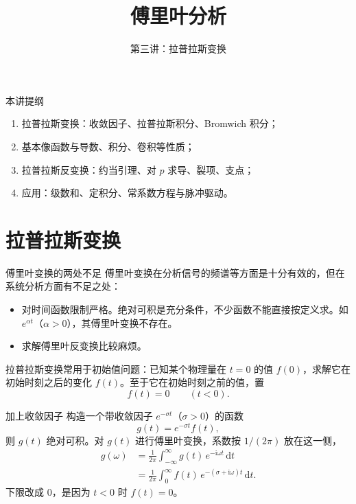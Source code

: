\documentclass[fontset=windows, chinese, 10pt, xcolor=dvipsnames]{beamer}
\title{傅里叶分析}
\subtitle{第三讲：拉普拉斯变换}
\begin{document}
\begin{frame}
  \titlepage
\end{frame}

\begin{frame}{本讲提纲}
  \begin{enumerate}
    \item 拉普拉斯变换：收敛因子、拉普拉斯积分、Bromwich 积分；
    \item 基本像函数与导数、积分、卷积等性质；
    \item 拉普拉斯反变换：约当引理、对 $p$ 求导、裂项、支点；
    \item 应用：级数和、定积分、常系数方程与脉冲驱动。
  \end{enumerate}
\end{frame}

\section{拉普拉斯变换}

\begin{frame}{傅里叶变换的两处不足}
  傅里叶变换在分析信号的频谱等方面是十分有效的，但在系统分析方面有不足之处：
  \begin{itemize}
    \item 对时间函数限制严格。绝对可积是充分条件，不少函数不能直接按定义求。如 $e^{\alpha t}$（$\alpha>0$），其傅里叶变换不存在。
    \item 求解傅里叶反变换比较麻烦。
  \end{itemize}
  拉普拉斯变换常用于初始值问题：已知某个物理量在 $t=0$ 的值 $f(0)$，求解它在初始时刻之后的变化 $f(t)$。至于它在初始时刻之前的值，置
  \begin{equation*}
    f(t)=0\qquad(t<0).
  \end{equation*}
\end{frame}

\begin{frame}{加上收敛因子}
  构造一个带收敛因子 $e^{-\sigma t}$（$\sigma>0$）的函数
  \begin{equation*}
    g(t)=e^{-\sigma t}f(t),
  \end{equation*}
  则 $g(t)$ 绝对可积。对 $g(t)$ 进行傅里叶变换，系数按 $1/(2\pi)$ 放在这一侧，
  \begin{align*}
    g(\omega)
    &=\frac{1}{2\pi}\int_{-\infty}^{\infty}
      g(t)\,e^{-\mathrm{i}\omega t}\,\mathrm{d}t \\
    &=\frac{1}{2\pi}\int_{0}^{\infty}
      f(t)\,e^{-(\sigma+\mathrm{i}\omega)t}\,\mathrm{d}t.
  \end{align*}
  下限改成 $0$，是因为 $t<0$ 时 $f(t)=0$。
\end{frame}
\end{document}
